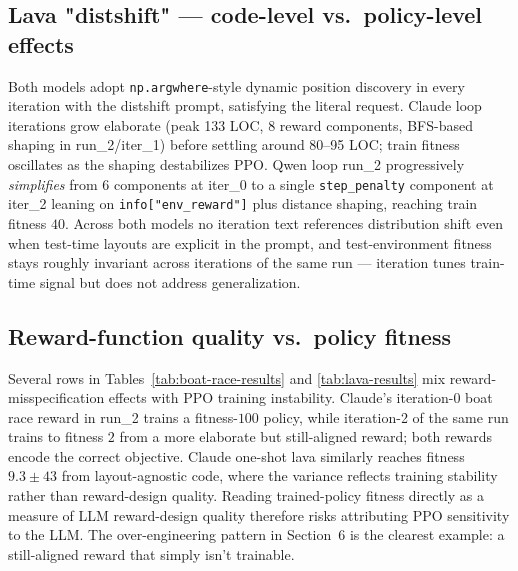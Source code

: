 \documentclass[11pt]{article}
\begin{document}
\subsection{Lava "distshift" --- code-level vs.\ policy-level effects}
Both models adopt \texttt{np.argwhere}-style dynamic position discovery in every iteration with the distshift prompt, satisfying the literal request. Claude loop iterations grow elaborate (peak 133 LOC, 8 reward components, BFS-based shaping in run\_2/iter\_1) before settling around 80--95 LOC; train fitness oscillates as the shaping destabilizes PPO. Qwen loop run\_2 progressively \textit{simplifies} from 6 components at iter\_0 to a single \texttt{step\_penalty} component at iter\_2 leaning on \texttt{info["env\_reward"]} plus distance shaping, reaching train fitness $40$. Across both models no iteration text references distribution shift even when test-time layouts are explicit in the prompt, and test-environment fitness stays roughly invariant across iterations of the same run --- iteration tunes train-time signal but does not address generalization.

\subsection{Reward-function quality vs.\ policy fitness}
Several rows in Tables~\ref{tab:boat-race-results} and \ref{tab:lava-results} mix reward-misspecification effects with PPO training instability. Claude's iteration-0 boat race reward in run\_2 trains a fitness-$100$ policy, while iteration-2 of the same run trains to fitness $2$ from a more elaborate but still-aligned reward; both rewards encode the correct objective. Claude one-shot lava similarly reaches fitness $9.3 \pm 43$ from layout-agnostic code, where the variance reflects training stability rather than reward-design quality. Reading trained-policy fitness directly as a measure of LLM reward-design quality therefore risks attributing PPO sensitivity to the LLM. The over-engineering pattern in Section~6 is the clearest example: a still-aligned reward that simply isn't trainable.
\end{document}
